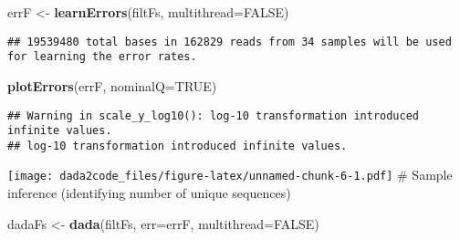 \documentclass[
]{article}
\newenvironment{Shaded}{\begin{snugshade}}{\end{snugshade}}
\newcommand{\AttributeTok}[1]{\textcolor[rgb]{0.13,0.29,0.53}{#1}}
\newcommand{\ConstantTok}[1]{\textcolor[rgb]{0.56,0.35,0.01}{#1}}
\newcommand{\FunctionTok}[1]{\textcolor[rgb]{0.13,0.29,0.53}{\textbf{#1}}}
\newcommand{\NormalTok}[1]{#1}
\newcommand{\OtherTok}[1]{\textcolor[rgb]{0.56,0.35,0.01}{#1}}
\begin{document}
\begin{Shaded}
\begin{Highlighting}[]
\NormalTok{errF }\OtherTok{\textless{}{-}} \FunctionTok{learnErrors}\NormalTok{(filtFs, }\AttributeTok{multithread=}\ConstantTok{FALSE}\NormalTok{)}
\end{Highlighting}
\end{Shaded}

\begin{verbatim}
## 19539480 total bases in 162829 reads from 34 samples will be used for learning the error rates.
\end{verbatim}

\begin{Shaded}
\begin{Highlighting}[]
\FunctionTok{plotErrors}\NormalTok{(errF, }\AttributeTok{nominalQ=}\ConstantTok{TRUE}\NormalTok{)}
\end{Highlighting}
\end{Shaded}

\begin{verbatim}
## Warning in scale_y_log10(): log-10 transformation introduced infinite values.
## log-10 transformation introduced infinite values.
\end{verbatim}

\texttt{[image: dada2code\_files/figure-latex/unnamed-chunk-6-1.pdf]} \#
Sample inference (identifying number of unique sequences)

\begin{Shaded}
\begin{Highlighting}[]
\NormalTok{dadaFs }\OtherTok{\textless{}{-}} \FunctionTok{dada}\NormalTok{(filtFs, }\AttributeTok{err=}\NormalTok{errF, }\AttributeTok{multithread=}\ConstantTok{FALSE}\NormalTok{)}
\end{Highlighting}
\end{Shaded}
\end{document}
